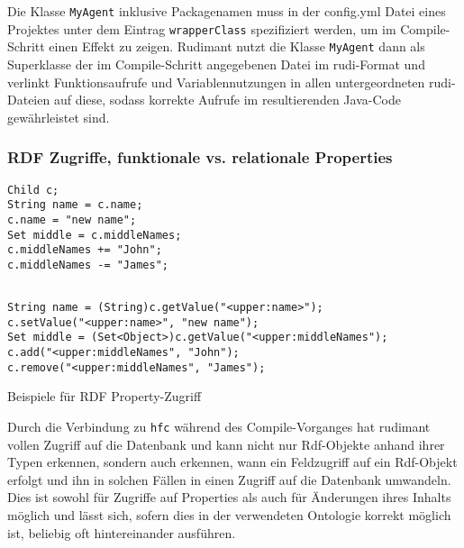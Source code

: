 Die Klasse \texttt{MyAgent} inklusive Packagenamen muss in der config.yml Datei
eines Projektes unter dem Eintrag \texttt{wrapperClass} spezifiziert werden, um
im Compile-Schritt einen Effekt zu zeigen. Rudimant nutzt die Klasse
\texttt{MyAgent} dann als Superklasse der im Compile-Schritt angegebenen Datei
im rudi-Format und verlinkt Funktionsaufrufe und Variablennutzungen in allen
untergeordneten rudi-Dateien auf diese, sodass korrekte Aufrufe im
resultierenden Java-Code gewährleistet sind.

\subsubsection{RDF Zugriffe, funktionale vs. relationale Properties}

\begin{table}[htbp]
  \centering
\begin{small}
\begin{minipage}[t]{0.35\textwidth}
\begin{verbatim}
Child c;
String name = c.name;
c.name = "new name";
Set middle = c.middleNames;
c.middleNames += "John";
c.middleNames -= "James";
\end{verbatim}
\end{minipage}
\begin{minipage}[t]{0.6\textwidth}
\begin{verbatim}

String name = (String)c.getValue("<upper:name>");
c.setValue("<upper:name>", "new name");
Set middle = (Set<Object>)c.getValue("<upper:middleNames");
c.add("<upper:middleNames", "John");
c.remove("<upper:middleNames", "James");
\end{verbatim}
\end{minipage}
\end{small}
  \caption{Beispiele für RDF Property-Zugriff}
  \label{tab:property-access}
\end{table}


Durch die Verbindung zu \texttt{hfc} während des Compile-Vorganges hat rudimant
vollen Zugriff auf die Datenbank und kann nicht nur Rdf-Objekte anhand ihrer
Typen erkennen, sondern auch erkennen, wann ein Feldzugriff auf ein Rdf-Objekt
erfolgt und ihn in solchen Fällen in einen Zugriff auf die Datenbank
umwandeln. Dies ist sowohl für Zugriffe auf Properties als auch für Änderungen
ihres Inhalts möglich und lässt sich, sofern dies in der verwendeten Ontologie
korrekt möglich ist, beliebig oft hintereinander ausführen.

